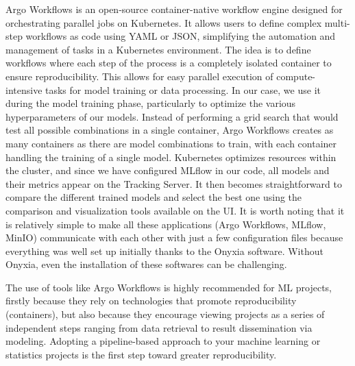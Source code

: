 Argo Workflows is an open-source container-native workflow engine designed for orchestrating parallel jobs on Kubernetes. It allows users to define complex multi-step workflows as code using YAML or JSON, simplifying the automation and management of tasks in a Kubernetes environment. The idea is to define workflows where each step of the process is a completely isolated container to ensure reproducibility. This allows for easy parallel execution of compute-intensive tasks for model training or data processing. In our case, we use it during the model training phase, particularly to optimize the various hyperparameters of our models. Instead of performing a grid search that would test all possible combinations in a single container, Argo Workflows creates as many containers as there are model combinations to train, with each container handling the training of a single model. Kubernetes optimizes resources within the cluster, and since we have configured MLflow in our code, all models and their metrics appear on the Tracking Server. It then becomes straightforward to compare the different trained models and select the best one using the comparison and visualization tools available on the UI. It is worth noting that it is relatively simple to make all these applications (Argo Workflows, MLflow, MinIO) communicate with each other with just a few configuration files because everything was well set up initially thanks to the Onyxia software. Without Onyxia, even the installation of these softwares can be challenging.

The use of tools like Argo Workflows is highly recommended for ML projects, firstly because they rely on technologies that promote reproducibility (containers), but also because they encourage viewing projects as a series of independent steps ranging from data retrieval to result dissemination via modeling. Adopting a pipeline-based approach to your machine learning or statistics projects is the first step toward greater reproducibility.


